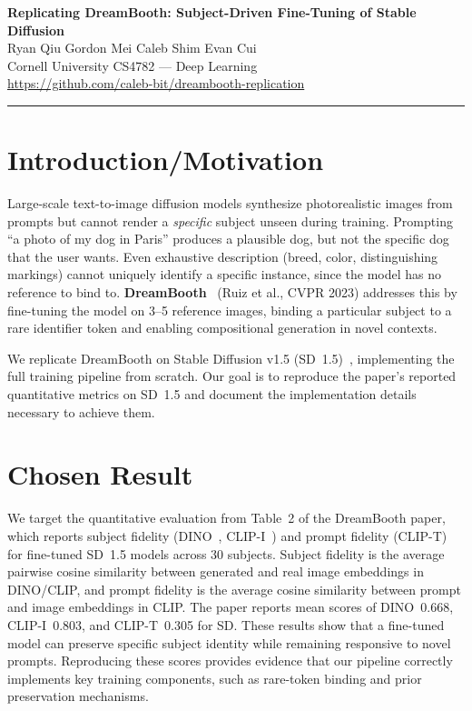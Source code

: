 \documentclass[11pt]{article}
\begin{document}
\begin{center}
  {\large\bfseries Replicating DreamBooth: Subject-Driven Fine-Tuning of Stable Diffusion}\\[4pt]
  Ryan Qiu \quad Gordon Mei \quad Caleb Shim \quad Evan Cui \\
  Cornell University \quad CS4782 --- Deep Learning \\[2pt]
  {\small \url{https://github.com/caleb-bit/dreambooth-replication}}
\end{center}

\vspace{2pt}\hrule\vspace{6pt}

\section{Introduction/Motivation}

Large-scale text-to-image diffusion models synthesize photorealistic images from prompts but cannot render a \emph{specific} subject unseen during training. Prompting ``a photo of my dog in Paris'' produces a plausible dog, but not the specific dog that the user wants. Even exhaustive description (breed, color, distinguishing markings) cannot uniquely identify a specific instance, since the model has no reference to bind to. \textbf{DreamBooth}~\cite{ruiz2023dreambooth} (Ruiz et al., CVPR 2023) addresses this by fine-tuning the model on 3--5 reference images, binding a particular subject to a rare identifier token and enabling compositional generation in novel contexts.

We replicate DreamBooth on Stable Diffusion v1.5 (SD~1.5)~\cite{rombach2022ldm}, implementing the full training pipeline from scratch. Our goal is to reproduce the paper's reported quantitative metrics on SD~1.5 and document the implementation details necessary to achieve them.


\section{Chosen Result}

We target the quantitative evaluation from Table~2 of the DreamBooth paper, which reports subject fidelity (DINO~\cite{caron2021dino}, CLIP-I~\cite{radford2021clip}) and prompt fidelity (CLIP-T) for fine-tuned SD~1.5 models across 30 subjects. Subject fidelity is the average pairwise cosine similarity between generated and real image embeddings in DINO/CLIP, and prompt fidelity is the average cosine similarity between prompt and image embeddings in CLIP. The paper reports mean scores of DINO~0.668, CLIP-I~0.803, and CLIP-T~0.305 for SD. These results show that a fine-tuned model can preserve specific subject identity while remaining responsive to novel prompts. Reproducing these scores provides evidence that our pipeline correctly implements key training components, such as rare-token binding and prior preservation mechanisms.
\end{document}

